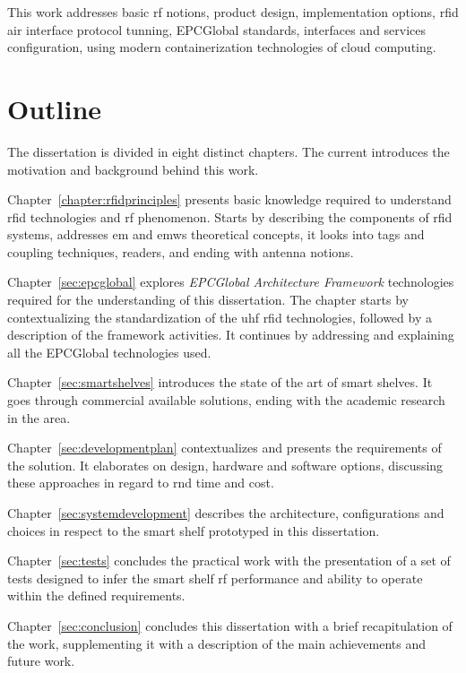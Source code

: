 This work addresses basic \ac{rf} notions, product design, implementation options, \ac{rfid} air interface protocol tunning, EPCGlobal standards, interfaces and services configuration, using modern containerization technologies of cloud computing.

\section{Outline}

The dissertation is divided in eight distinct chapters. The current introduces the motivation and background behind this work.

Chapter~\ref{chapter:rfidprinciples} presents basic knowledge required to understand \ac{rfid} technologies and \ac{rf} phenomenon. Starts by describing the components of \ac{rfid} systems, addresses \ac{em} and \acp{emw} theoretical concepts, it looks into tags and coupling techniques, readers, and ending with antenna notions.

Chapter~\ref{sec:epcglobal} explores \emph{EPCGlobal Architecture Framework} technologies required for the understanding of this dissertation.
The chapter starts by contextualizing the standardization of the \ac{uhf} \ac{rfid} technologies, followed by a description of the framework activities. It continues by addressing and explaining all the EPCGlobal technologies used.

Chapter~\ref{sec:smartshelves} introduces the state of the art of smart shelves. It goes through commercial available solutions, ending with the academic research in the area.

Chapter~\ref{sec:developmentplan} contextualizes and presents the requirements of the solution. It elaborates on design, hardware and software options, discussing these approaches in regard to \ac{rnd} time and cost.

Chapter~\ref{sec:systemdevelopment} describes the architecture, configurations and choices in respect to the smart shelf prototyped in this dissertation.

Chapter~\ref{sec:tests} concludes the practical work with the presentation of a set of tests designed to infer the smart shelf \ac{rf} performance and ability to operate within the defined requirements.

Chapter~\ref{sec:conclusion} concludes this dissertation with a brief recapitulation of the work, supplementing it with a description of the main achievements and future work.

\cleardoublepage